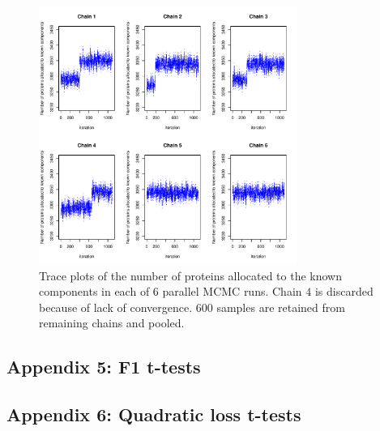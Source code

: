\documentclass[12pt,english]{article}\usepackage[]{graphicx}\usepackage[]{color}
\newenvironment{knitrout}{}{} %
\begin{document}
\begin{figure}[ht]
  \centering
\begin{knitrout}
\color{fgcolor}
\includegraphics[width=0.75\textwidth]{figure/traceplots-1} 

\end{knitrout}
\caption{Trace plots of the number of proteins allocated to the known
  components in each of 6 parallel MCMC runs. Chain $4$ is discarded
  because of lack of convergence. $600$ samples are retained from
  remaining chains and pooled.}
  \label{figure::mcmcchains}
\end{figure}


\clearpage

\subsection{Appendix 5: F1 t-tests}\label{app::ttestf1}





\clearpage

\subsection{Appendix 6: Quadratic loss t-tests}
\end{document}
